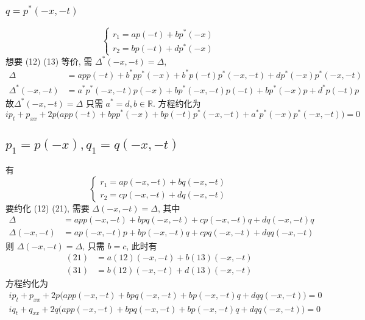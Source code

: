 \subsubsection{ $ q = p^{*}(-x,-t) $}
\begin{equation*}
    \begin{cases}
        r_1 = ap(-t) + bp^{*}(-x) \\
        r_2 = bp(-t) + dp^{*}(-x)
    \end{cases}
\end{equation*}
想要 (12) (13) 等价, 需 $ \Delta^{*}(-x,-t) = \Delta $,
\begin{equation*}
    \begin{aligned}
        \Delta &= app(-t) + b^{*}pp^{*}(-x) + b^{*}p(-t)p^{*}(-x,-t) + dp^{*}(-x)p^{*}(-x,-t) \\
        \Delta^{*}(-x,-t) &= a^{*}p^{*}(-x,-t)p(-x) + bp^{*}(-x,-t)p(-t) + bp^{*}(-x)p + d^{*}p(-t)p   
    \end{aligned}
\end{equation*}
故$ \Delta^{*}(-x,-t) = \Delta $ 只需 $ a^{*} = d , b \in \mathbb{R}$. 方程约化为
\begin{equation*}
    ip_t + p_{xx} + 2p \big( app(-t) + bpp^{*}(-x) + bp(-t)p^{*}(-x,-t) + a^{*}p^{*}(-x)p^{*}(-x,-t) \big) = 0
\end{equation*}

\subsection{$ p_{1} = p(-x), q_{1} = q(-x,-t) $}
有
\begin{equation}
    \begin{cases}
        r_1 = ap(-x,-t) + bq(-x,-t) \\
        r_2 = cp(-x,-t) + dq(-x,-t)
    \end{cases}
\end{equation}
要约化 (12) (21), 需要 $ \Delta(-x,-t) = \Delta $, 其中 
\begin{equation}
    \begin{aligned}
        \Delta &= app(-x,-t) + bpq(-x,-t) + cp(-x,-t)q + dq(-x,-t)q \\
        \Delta(-x,-t) &= ap(-x,-t)p + bp(-x,-t)q + cpq(-x,-t) + dqq(-x,-t)
    \end{aligned}
\end{equation} 
则 $ \Delta(-x,-t) = \Delta $, 只需 $ b=c $, 此时有
\begin{equation*}
    \begin{aligned}
        (21) &= a(12)(-x,-t) + b(13)(-x,-t) \\
        (31) &= b(12)(-x,-t) + d(13)(-x,-t)
    \end{aligned}
\end{equation*}
方程约化为
\begin{equation*}
    \begin{aligned}
        ip_{t} + p_{xx} + 2p \big( app(-x,-t) + bpq(-x,-t) + bp(-x,-t)q + dqq(-x,-t) \big) = 0\\
        iq_{t} + q_{xx} + 2q \big( app(-x,-t) + bpq(-x,-t) + bp(-x,-t)q + dqq(-x,-t) \big) = 0
    \end{aligned}
\end{equation*}

